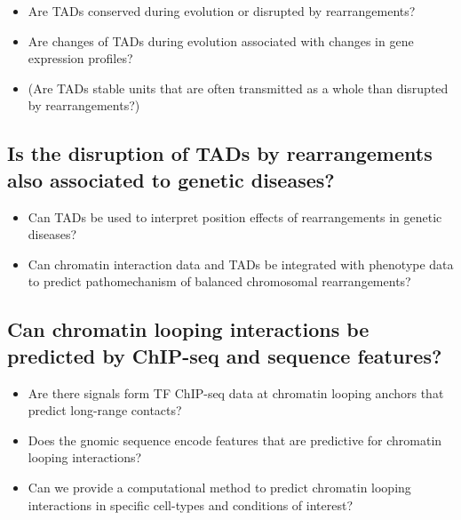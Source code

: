 \documentclass[a4paper,twoside=true,openright,parskip=full,chapterprefix=true,11pt,headings=normal,bibliography=totoc,listof=totoc,titlepage=on,captions=tableabove,draft=false]{scrreprt}
\providecommand{\tightlist}{%
  \setlength{\itemsep}{0pt}\setlength{\parskip}{0pt}}
\theoremstyle{definition}
\theoremstyle{definition}
\theoremstyle{definition}
\theoremstyle{remark}
\begin{document}
\begin{itemize}
\tightlist
\item
  Are TADs conserved during evolution or disrupted by rearrangements?
\item
  Are changes of TADs during evolution associated with changes in gene
  expression profiles?
\item
  (Are TADs stable units that are often transmitted as a whole than
  disrupted by rearrangements?)
\end{itemize}

\subsection*{Is the disruption of TADs by rearrangements also associated
to genetic
diseases?}\label{is-the-disruption-of-tads-by-rearrangements-also-associated-to-genetic-diseases}

\begin{itemize}
\tightlist
\item
  Can TADs be used to interpret position effects of rearrangements in
  genetic diseases?
\item
  Can chromatin interaction data and TADs be integrated with phenotype
  data to predict pathomechanism of balanced chromosomal rearrangements?
\end{itemize}

\subsection*{Can chromatin looping interactions be predicted by ChIP-seq
and sequence
features?}\label{can-chromatin-looping-interactions-be-predicted-by-chip-seq-and-sequence-features}

\begin{itemize}
\tightlist
\item
  Are there signals form TF ChIP-seq data at chromatin looping anchors
  that predict long-range contacts?
\item
  Does the gnomic sequence encode features that are predictive for
  chromatin looping interactions?
\item
  Can we provide a computational method to predict chromatin looping
  interactions in specific cell-types and conditions of interest?
\end{itemize}
\end{document}
